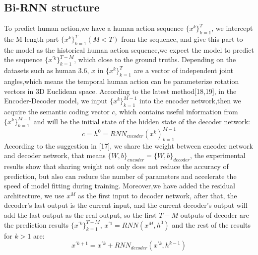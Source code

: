 \documentclass[conference]{IEEEtran}
\begin{document}
\subsection{Bi-RNN structure}
To predict human action,we have a human action sequence $\{x^k\}^T_{k=1}$, 
we intercept the M-length part $\{x^k\}^T_{k=1} (M < T)$ from the sequence,
and give this part to the model as the historical human action sequence,we expect the model to predict the sequence $\{x^{'k}\}^{T-M}_{k=1}$,
which close to the ground truths.
Depending on the datasets such as human 3.6, $x$ in $\{x^k\}^T_{k=1}$ are a vector of independent joint angles,which means the temporal human action can be parameterize rotation vectors in 3D Euclidean space.
According to the latest method[18,19], in the Encoder-Decoder model, we input $\{x^k\}^{M-1}_{k=1}$ into the encoder network,then we acquire the semantic coding vector  $c$,
which contains useful information from $\{x^k\}^{M-1}_{k=1}$ and will be the initial state of the hidden state of the decoder network:
\begin{equation}
c = h^0 = RNN_{encoder}(x^k)^{M-1}_{k=1}\label{1}
\end{equation}
According to the suggestion in [17], we share the weight between encoder network and decoder network,
that means $\{W , b\}_{encoder} = \{W,b\}_{decoder}$,
the experimental results show that sharing weight not only does not reduce the accuracy of prediction,
but also can reduce the number of parameters and accelerate the speed of model fitting during training.
Moreover,we have added the residual architecture, we use $x^M$ as the first input to decoder network,
after that, the decoder's last output is the current input, 
and the current decoder's output will add the last output as the real output,
so the first $T - M$ outputs of decoder are the prediction results $\{x^{'k}\}^{T-M}_{k=1}$,
$x^{'1} = RNN(x^M , h^0)$ and the rest of the results for $k > 1$ are:
\begin{equation}
x^{'k+1} = x^{'k} + RNN_{decoder}(x^{'k} , h^{k-1})\label{2}
\end{equation}
\end{document}
